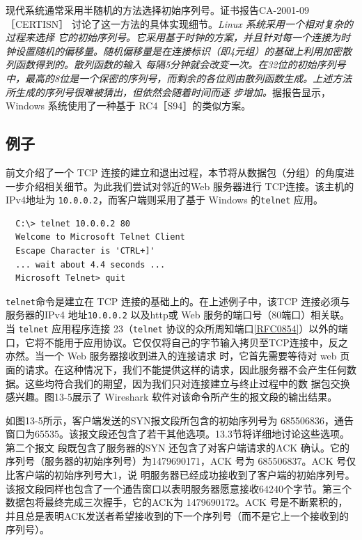 现代系统通常采用半随机的方法选择初始序列号。证书报告CA-2001-09 ［CERTISN］
讨论了这一方法的具体实现细节。\emph{\color{red}Linux 系统采用一个相对复杂的过程来选择
  它的初始序列号\footnotemark。它采用基于时钟的方案，并且针对每一个连接为时钟设置随机的偏移量。随机偏移量是在连接标识（即4元组）的基础上利用加密散列函数得到的。散列函数的输入
  每隔5分钟就会改变一次。在32位的初始序列号中，最高的8位是一个保密的序列号，而剩余的各位则由散列函数生成。上述方法所生成的序列号很难被猜出，但依然会随着时间而逐
步增加。}据报告显示，Windows 系统使用了一种基于 RC4［S94］的类似方案。
\subsection{例子}
前文介绍了一个 TCP 连接的建立和退出过程，本节将从数据包（分组）的角度进一步介绍相关细节。为此我们尝试对邻近的Web 服务器进行
TCP连接。该主机的IPv4地址为
\verb|10.0.0.2|，而客户端则采用了基于 Windows 的\verb|telnet| 应用。

\begin{verbatim}
  C:\> telnet 10.0.0.2 80
  Welcome to Microsoft Telnet Client
  Escape Character is 'CTRL+]'
  ... wait about 4.4 seconds ...
  Microsoft Telnet> quit
\end{verbatim}

\verb|telnet|命令是建立在 TCP 连接的基础上的。在上述例子中，该TCP 连接必须与服务器的IPv4
地址\verb|10.0.0.2| 以及http或 Web 服务的端口号（80端口）相关联。当 \verb|telnet| 应用程序连接
23（\verb|telnet|
协议的众所周知端口\href{https://www.rfc-editor.org/rfc/rfc0854}{[RFC0854]}）以外的端口，它将不能用于应用协议。它仅仅将自己的字节输入拷贝至TCP连接中，反之亦然。当一个
Web 服务器接收到进入的连接请求
时，它首先需要等待对 web
页面的请求。在这种情况下，我们不能提供这样的请求，因此服务器不会产生任何数据。这些均符合我们的期望，因为我们只对连接建立与终止过程中的数
据包交换感兴趣。图13-5展示了 Wireshark 软件对该命令所产生的报文段的输出结果。

如图13-5所示，客户端发送的SYN报文段所包含的初始序列号为
685506836，通告窗口为65535。该报文段还包含了若干其他选项。13.3节将详细地讨论这些选项。第二个报文
段既包含了服务器的SYN 还包含了对客户端请求的ACK 确认。它的序列号（服务器的初始序列号）为1479690171，ACK 号为
685506837。ACK 号仅比客户端的初始序列号大1，说
明服务器已经成功接收到了客户端的初始序列号。该报文段同样也包含了一个通告窗口以表明服务器愿意接收64240个字节。第三个数据包将最终完成三次握手，它的ACK为
1479690172。ACK 号是不断累积的，并且总是表明ACK发送者希望接收到的下一个序列号（而不是它上一个接收到的序列号）。

